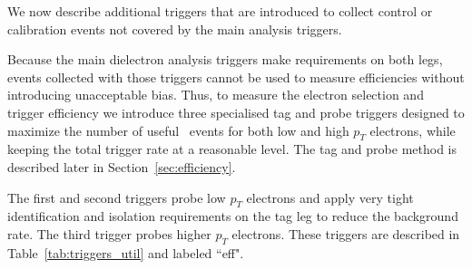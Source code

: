 We now describe additional triggers that are introduced to collect control or
calibration events not covered by the main analysis triggers.

Because the main dielectron analysis triggers make requirements on
both legs, events collected with those triggers cannot be used to measure
efficiencies without introducing unacceptable bias.
Thus, to measure the electron selection and trigger efficiency
we introduce three specialised tag and probe triggers designed to maximize
the number of useful \dyll~events for both low and high $p_{T}$ electrons,
while keeping the total trigger rate at a reasonable level. 
The tag and probe method is described later in Section~\ref{sec:efficiency}.

The first and second triggers probe low $p_T$ electrons and apply very tight identification 
and isolation requirements on the tag leg to reduce the background rate.
The third trigger probes higher $p_{T}$ electrons.
These triggers are described in Table~\ref{tab:triggers_util} and labeled ``eff".

